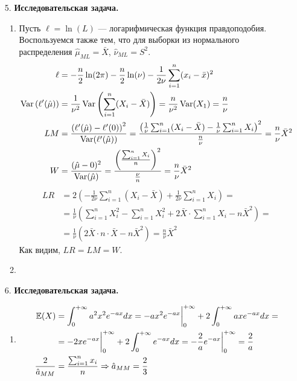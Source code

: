 \begin{enumerate}
\item[5.] \textbf{Исследовательская задача.}
\begin{enumerate}
\item
Пусть $\ell=\ln(L)$ — логарифмическая функция правдоподобия.
Воспользуемся также тем, что для выборки из нормального распределения
$\hat{\mu}_{ML}=\bar{X}$, $\hat{\nu}_{ML}=S^2$.
\begin{align*}
\ell &= -\frac{n}{2}\ln(2\pi) - \frac{n}{2}\ln(\nu) - \frac{1}{2\nu}\sum^n_{i=1}(x_i-\bar{x})^2 \\
\operatorname{Var}\left(\ell'(\hat{\mu})\right) &= \frac{1}{\nu^2} \operatorname{Var}\left(\sum^n_{i=1}(X_i-\bar{X})\right) = \frac{n}{\nu^2}\operatorname{Var}(X_1) = \frac{n}{\nu} \\
LM &= \frac{\left(\ell'(\hat{\mu}) - \ell'(0)\right)^2}{\operatorname{Var}(\ell'(\hat{\mu}))} = \frac{\left(\frac{1}{\nu}\sum^n_{i=1}(X_i-\bar{X})-\frac{1}{\nu}\sum^n_{i=1}X_i\right)^2}{\frac{n}{\nu}} = \frac{n}{\nu}\bar{X}^2 \\
W &= \frac{(\hat{\mu}-0)^2}{\operatorname{Var}(\hat{\mu})} = \frac{\left(\frac{\sum^n_{i=1}X_i}{n}\right)^2}{\frac{\nu}{n}}=\frac{n}{\nu}\bar{X}^2 \\
\end{align*}
\begin{align*}
LR &= 2\left(-\frac{1}{2\nu}\sum^n_{i=1}(X_i-\bar{X}) + \frac{1}{2\nu}\sum^n_{i=1}X_i\right) = \\
&= \frac{1}{\nu}\left(\sum^n_{i=1}X^2_i-\sum^n_{i=1}X^2_i+2\bar{X} \cdot \sum^n_{i=1}X_i-n\bar{X}^2\right) = \\
&= \frac{1}{\nu} \left(2\bar{X}\cdot n\cdot\bar{X}-n\bar{X}^2\right)=\frac{n}{\nu}\bar{X}^2
\end{align*}
Как видим, $LR=LM=W$.
\item
\end{enumerate}

\item[6.] \textbf{Исследовательская задача.}

\begin{enumerate}

\item
\begin{align*}
\operatorname{\mathbb{E}}(X) &= \int^{+\infty}_{0}a^2x^2e^{-ax} dx = -ax^2e^{-ax}\bigg|^{+\infty}_0 + 2\int^{+\infty}_{0}axe^{-ax} dx= \\
&= -2xe^{-ax}\bigg|^{+\infty}_0 + 2\int^{+\infty}_{0}e^{-ax} dx = -\frac{2}{a}e^{-ax}\bigg|^{+\infty}_0=\frac{2}{a} \\
\frac{2}{\hat{a}_{MM}} &= \frac{\sum^{n}_{i=1}x_i}{n} \Rightarrow \hat{a}_{MM}=\frac{2}{3}
\end{align*}


\end{enumerate}
\end{enumerate}

